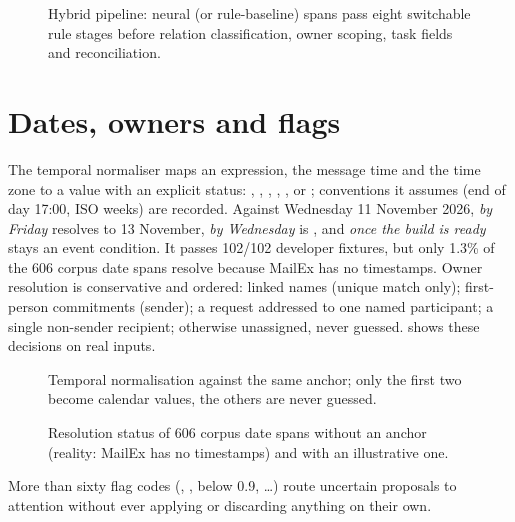 \begin{figure}[htbp]
\centering
{}
\caption{Hybrid pipeline: neural (or rule-baseline) spans pass eight switchable rule stages before relation classification, owner scoping, task fields and reconciliation.}
\label{fig:hybrid}
\end{figure}

\section{Dates, owners and flags}
The temporal normaliser maps an expression, the message time and the time zone to a value with an explicit status: , , , , ,  or ; conventions it assumes (end of day 17:00, ISO weeks) are recorded. Against Wednesday 11 November 2026, \emph{by Friday} resolves to 13 November, \emph{by Wednesday} is , and \emph{once the build is ready} stays an event condition. It passes 102/102 developer fixtures, but only 1.3\% of the 606 corpus date spans resolve because MailEx has no timestamps. Owner resolution is conservative and ordered: linked names (unique match only); first-person commitments (sender); a request addressed to one named participant; a single non-sender recipient; otherwise unassigned, never guessed.  shows these decisions on real inputs.

\begin{figure}[htbp]
\centering
{}
\caption{Temporal normalisation against the same anchor; only the first two become calendar values, the others are never guessed.}
\label{fig:temporal}
\end{figure}

\begin{figure}[htbp]
\centering
{}
\caption{Resolution status of 606 corpus date spans without an anchor (reality: MailEx has no timestamps) and with an illustrative one.}
\label{fig:tempstatus}
\end{figure}

More than sixty flag codes (, ,  below 0.9, \ldots) route uncertain proposals to attention without ever applying or discarding anything on their own.


